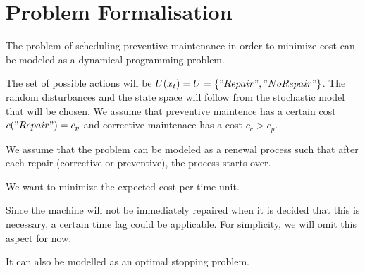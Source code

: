 

\section{Problem Formalisation}
The problem of scheduling preventive maintenance in order to minimize cost can be modeled as a dynamical programming problem. 

The set of possible actions will be $U(x_t)=U=\{"Repair", "No Repair"\}$. The random disturbances and the state space will follow from the stochastic model that will be chosen. We assume that preventive maintence has a certain cost $c("Repair")=c_p$ and corrective maintenace has a cost $c_c>c_p$.

We assume that the problem can be modeled as a renewal process such that after each repair (corrective or preventive), the process starts over.

We want to minimize the expected cost per time unit.

Since the machine will not be immediately repaired when it is decided that this is necessary, a certain time lag could be applicable. For simplicity, we will omit this aspect for now.

It can also be modelled as an optimal stopping problem.



